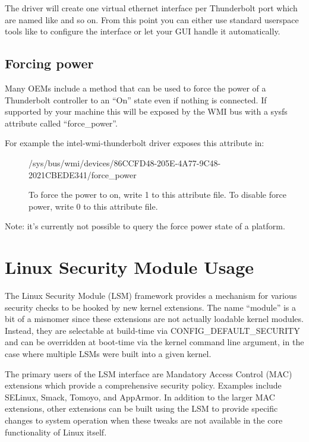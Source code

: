 \documentclass[a4paper,8pt,english]{sphinxmanual}
\begin{document}
The driver will create one virtual ethernet interface per Thunderbolt
port which are named like  and so on. From this point
you can either use standard userspace tools like  to
configure the interface or let your GUI handle it automatically.


\section{Forcing power}
\label{admin-guide/thunderbolt:forcing-power}
Many OEMs include a method that can be used to force the power of a
Thunderbolt controller to an ``On'' state even if nothing is connected.
If supported by your machine this will be exposed by the WMI bus with
a sysfs attribute called ``force\_power''.
\begin{description}
\item[{For example the intel-wmi-thunderbolt driver exposes this attribute in:}] \leavevmode
/sys/bus/wmi/devices/86CCFD48-205E-4A77-9C48-2021CBEDE341/force\_power

To force the power to on, write 1 to this attribute file.
To disable force power, write 0 to this attribute file.

\end{description}

Note: it's currently not possible to query the force power state of a platform.


\chapter{Linux Security Module Usage}
\label{admin-guide/LSM/index:linux-security-module-usage}\label{admin-guide/LSM/index::doc}
The Linux Security Module (LSM) framework provides a mechanism for
various security checks to be hooked by new kernel extensions. The name
``module'' is a bit of a misnomer since these extensions are not actually
loadable kernel modules. Instead, they are selectable at build-time via
CONFIG\_DEFAULT\_SECURITY and can be overridden at boot-time via the
 kernel command line argument, in the case where multiple
LSMs were built into a given kernel.

The primary users of the LSM interface are Mandatory Access Control
(MAC) extensions which provide a comprehensive security policy. Examples
include SELinux, Smack, Tomoyo, and AppArmor. In addition to the larger
MAC extensions, other extensions can be built using the LSM to provide
specific changes to system operation when these tweaks are not available
in the core functionality of Linux itself.
\end{document}
